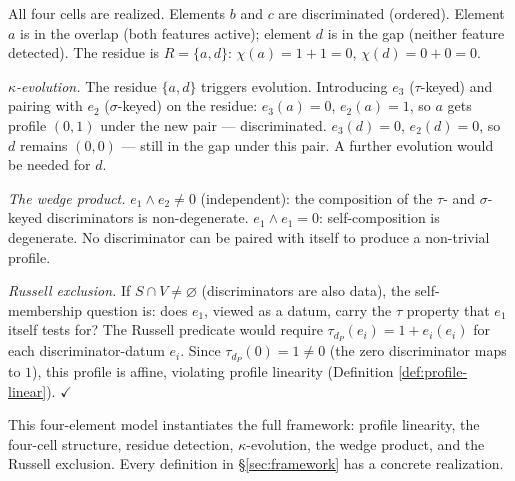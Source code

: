 All four cells are realized. Elements $b$ and $c$ are
discriminated (ordered). Element $a$ is in the overlap
(both features active); element $d$ is in the gap
(neither feature detected). The residue is
$R = \{a, d\}$: $\chi(a) = 1 + 1 = 0$,
$\chi(d) = 0 + 0 = 0$.

\emph{$\kappa$-evolution.}
The residue $\{a, d\}$ triggers evolution. Introducing
$e_3$ ($\tau$-keyed) and pairing with $e_2$ ($\sigma$-keyed)
on the residue: $e_3(a) = 0$, $e_2(a) = 1$, so $a$ gets
profile $(0,1)$ under the new pair --- discriminated.
$e_3(d) = 0$, $e_2(d) = 0$, so $d$ remains $(0,0)$ ---
still in the gap under this pair. A further evolution
would be needed for $d$.

\emph{The wedge product.}
$e_1 \wedge e_2 \neq 0$ (independent): the composition
of the $\tau$- and $\sigma$-keyed discriminators is
non-degenerate. $e_1 \wedge e_1 = 0$: self-composition
is degenerate. No discriminator can be paired with itself
to produce a non-trivial profile.

\emph{Russell exclusion.}
If $S \cap V \neq \varnothing$ (discriminators are also
data), the self-membership question is: does $e_1$,
viewed as a datum, carry the $\tau$ property that $e_1$
itself tests for? The Russell predicate would require
$\tau_{d_P}(e_i) = 1 + e_i(e_i)$ for each
discriminator-datum $e_i$. Since $\tau_{d_P}(0) = 1
\neq 0$ (the zero discriminator maps to $1$), this
profile is affine, violating profile linearity (Definition \ref{def:profile-linear}). $\checkmark$

This four-element model instantiates the full framework:
profile linearity, the four-cell structure, residue
detection, $\kappa$-evolution, the wedge product, and the
Russell exclusion. Every definition in \S\ref{sec:framework}
has a concrete realization.
